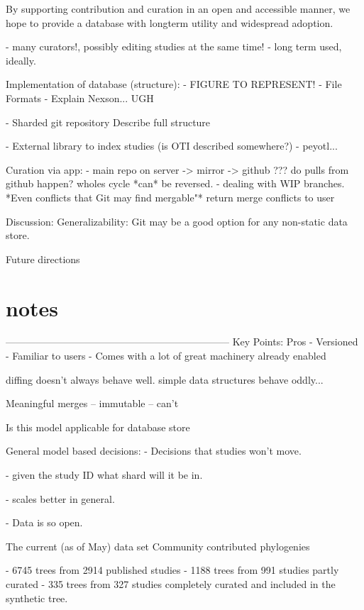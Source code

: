 \documentclass[a4paper,10pt]{article}
\begin{document}
By supporting contribution and curation in an open and accessible manner, we hope to provide a database with longterm utility and widespread adoption.

          - many curators!, possibly editing studies at the same time!
          - long term used, ideally.

           Implementation of database (structure):
      - FIGURE TO REPRESENT!
      - File Formats
         - Explain Nexson... UGH
         
      - Sharded git repository
          Describe full structure 
          
      - External library to index studies (is OTI described somewhere?)
      - peyotl...
      
      Curation via app:
        - main repo on server -> mirror -> github
            ??? do pulls from github happen? wholes cycle *can* be reversed.
        - dealing with WIP branches.
        *Even conflicts that Git may find mergable"*
        return merge conflicts to user

 Discussion:
   Generalizability:
      Git may be a good option for any non-static data store.
      
  Future directions

  
  



\section{notes}
  --------------------------------------------------------------------
Key Points:
Pros
 - Versioned
 - Familiar to users
 - Comes with a lot of great machinery already enabled

diffing doesn't always behave well.
simple data structures behave oddly...

Meaningful merges
 -- immutable 
 -- can't

Is this model applicable for database store

General model based decisions:
- Decisions that studies won't move.

- given the study ID what shard will it be in.

- scales better in general.

- Data is so open.



 The current (as of May) data set
 Community contributed phylogenies

 - 6745 trees from 2914 published studies
 - 1188 trees from 991 studies partly curated 
 - 335 trees from 327 studies completely curated and included in the synthetic tree.
\end{document}
